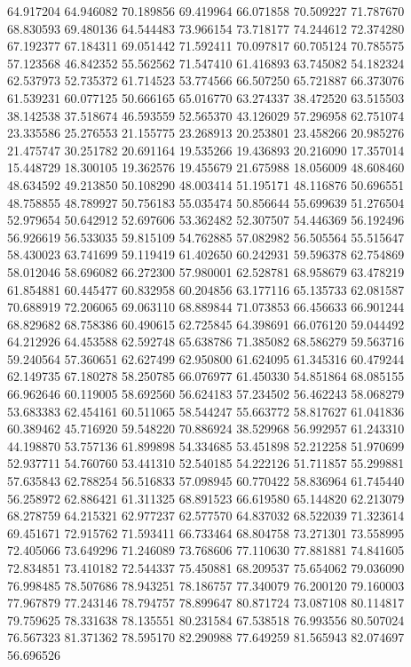 64.917204
64.946082
70.189856
69.419964
66.071858
70.509227
71.787670
68.830593
69.480136
64.544483
73.966154
73.718177
74.244612
72.374280
67.192377
67.184311
69.051442
71.592411
70.097817
60.705124
70.785575
57.123568
46.842352
55.562562
71.547410
61.416893
63.745082
54.182324
62.537973
52.735372
61.714523
53.774566
66.507250
65.721887
66.373076
61.539231
60.077125
50.666165
65.016770
63.274337
38.472520
63.515503
38.142538
37.518674
46.593559
52.565370
43.126029
57.296958
62.751074
23.335586
25.276553
21.155775
23.268913
20.253801
23.458266
20.985276
21.475747
30.251782
20.691164
19.535266
19.436893
20.216090
17.357014
15.448729
18.300105
19.362576
19.455679
21.675988
18.056009
48.608460
48.634592
49.213850
50.108290
48.003414
51.195171
48.116876
50.696551
48.758855
48.789927
50.756183
55.035474
50.856644
55.699639
51.276504
52.979654
50.642912
52.697606
53.362482
52.307507
54.446369
56.192496
56.926619
56.533035
59.815109
54.762885
57.082982
56.505564
55.515647
58.430023
63.741699
59.119419
61.402650
60.242931
59.596378
62.754869
58.012046
58.696082
66.272300
57.980001
62.528781
68.958679
63.478219
61.854881
60.445477
60.832958
60.204856
63.177116
65.135733
62.081587
70.688919
72.206065
69.063110
68.889844
71.073853
66.456633
66.901244
68.829682
68.758386
60.490615
62.725845
64.398691
66.076120
59.044492
64.212926
64.453588
62.592748
65.638786
71.385082
68.586279
59.563716
59.240564
57.360651
62.627499
62.950800
61.624095
61.345316
60.479244
62.149735
67.180278
58.250785
66.076977
61.450330
54.851864
68.085155
66.962646
60.119005
58.692560
56.624183
57.234502
56.462243
58.068279
53.683383
62.454161
60.511065
58.544247
55.663772
58.817627
61.041836
60.389462
45.716920
59.548220
70.886924
38.529968
56.992957
61.243310
44.198870
53.757136
61.899898
54.334685
53.451898
52.212258
51.970699
52.937711
54.760760
53.441310
52.540185
54.222126
51.711857
55.299881
57.635843
62.788254
56.516833
57.098945
60.770422
58.836964
61.745440
56.258972
62.886421
61.311325
68.891523
66.619580
65.144820
62.213079
68.278759
64.215321
62.977237
62.577570
64.837032
68.522039
71.323614
69.451671
72.915762
71.593411
66.733464
68.804758
73.271301
73.558995
72.405066
73.649296
71.246089
73.768606
77.110630
77.881881
74.841605
72.834851
73.410182
72.544337
75.450881
68.209537
75.654062
79.036090
76.998485
78.507686
78.943251
78.186757
77.340079
76.200120
79.160003
77.967879
77.243146
78.794757
78.899647
80.871724
73.087108
80.114817
79.759625
78.331638
78.135551
80.231584
67.538518
76.993556
80.507024
76.567323
81.371362
78.595170
82.290988
77.649259
81.565943
82.074697
56.696526
